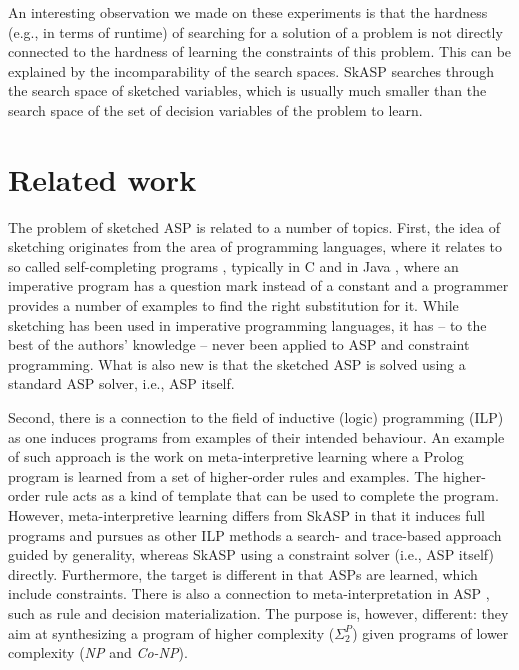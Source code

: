 An interesting observation we made on these experiments is that the 
hardness (e.g., in terms of runtime) of searching for a solution of 
a problem is not directly connected to the hardness of learning the 
constraints of this problem. This can be explained by the incomparability of the search spaces. 
SkASP searches through the search space of sketched variables, 
which is usually much smaller than  the search space of the set of decision variables 
of the problem to learn.

\section{Related work}\label{sec:related_work}
The problem of sketched ASP is related to a number of topics.
First, the idea of sketching originates from the area of programming languages, where
it relates to so called self-completing programs \parencite{sketching_phd_thesis}, typically in C \parencite{sketching_original} and in Java \parencite{jsketch}, where an imperative program has a question mark instead of a constant and a programmer provides a number of examples to find the right substitution for it. While sketching has been used in imperative programming languages, it has -- to the best of the authors' knowledge -- never been applied to ASP and constraint programming.  What is also new is that the sketched ASP is solved using a standard ASP solver, i.e., ASP itself.

Second, there is a connection to the field of inductive (logic) programming (ILP)  \parencite{ilp_book,ilp_original,gulwani2015inductive}
as one induces programs from examples of their intended behaviour.  
An example of such approach is the work on meta-interpretive learning \parencite{MuggletonMLJ14,MuggletonMLJ15} where 
a Prolog program is learned from a set of higher-order rules and examples. The higher-order rule acts as a kind of template
that can be used to complete the program. 
However, meta-interpretive learning differs from SkASP in that it induces full programs 
and pursues as other ILP methods a search- and trace-based approach guided by generality, 
whereas SkASP using a constraint solver (i.e., ASP itself) directly.  Furthermore, the target is different in that ASPs are learned, which include constraints. %
There is also a connection to meta-interpretation in ASP \parencite{asp_meta}, such as rule and decision materialization. The purpose is, however, different: they aim at synthesizing a program of higher complexity ($\Sigma_2^P$) given programs of lower complexity (\textit{NP} and \textit{Co-NP}).


